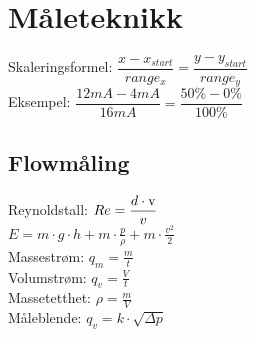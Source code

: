 \section{Måleteknikk}
\vskip 2.5pt 
Skaleringsformel:
$\dfrac{x-x_{start}}{range_x}=\dfrac{y-y_{start}}{range_y}$\\
\vskip 2.5pt 
Eksempel: $\dfrac{12mA-4mA}{16mA}=\dfrac{50\%-0\%}{100\%}$
\vskip 2.5pt 
\subsection*{Flowmåling}
\vskip 2.5pt 
Reynoldstall: $Re=\dfrac {d \cdot \text v}{v}$\\
\vskip 2.5pt 
$E=m\cdot g\cdot h+m\cdot \frac{p}{\rho}+m\cdot \frac {v^2}{2} $\\
\vskip 2.5pt 
Massestrøm: $q_m=\frac{m}{t}$\\
\vskip 2.5pt 
Volumstrøm: $q_v=\frac{V}{t}$\\
\vskip 2.5pt 
Massetetthet: $\rho=\frac{m}{V}$\\
\vskip 2.5pt 
Måleblende: $q_v=k\cdot \sqrt{\Delta p}$\\
\vskip 2.5pt 
